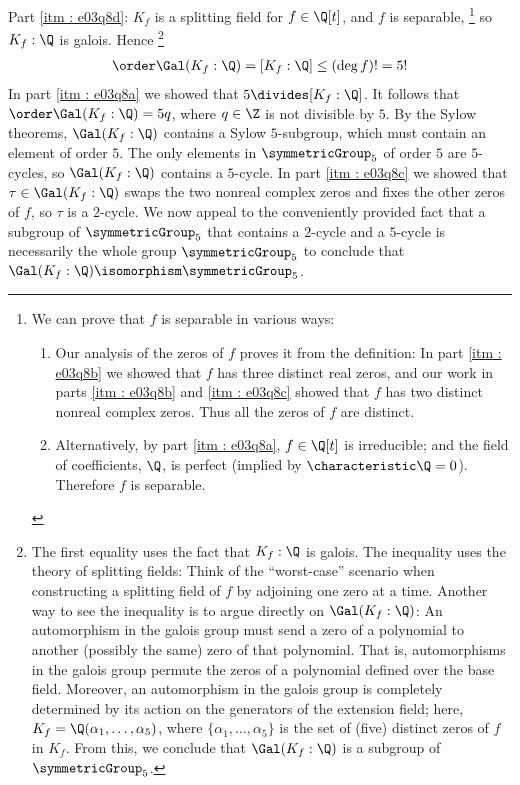 {Part \ref{itm : e03q8d}: $K_{f}$ is a splitting field for $f \in \Q[t]$, and $f$ is separable,%
\footnote{We can prove that $f$ is separable in various ways:
\begin{enumerate}
\item Our analysis of the zeros of $f$ proves it from the definition: In part \ref{itm : e03q8b} we showed that $f$ has three distinct real zeros, and our work in parts \ref{itm : e03q8b} and \ref{itm : e03q8c} showed that $f$ has two distinct nonreal complex zeros. Thus all the zeros of $f$ are distinct.
\item Alternatively, by part \ref{itm : e03q8a}, $f \in \Q[t]$ is irreducible; and the field of coefficients, $\Q$, is perfect (implied by $\characteristic \Q = 0$). Therefore $f$ is separable.
\end{enumerate}} %
so $K_{f} : \Q$ is galois. Hence%
\footnote{The first equality uses the fact that $K_{f} : \Q$ is galois. The inequality uses the theory of splitting fields: Think of the ``worst-case'' scenario when constructing a splitting field of $f$ by adjoining one zero at a time. Another way to see the inequality is to argue directly on $\Gal(K_{f} : \Q)$: An automorphism in the galois group must send a zero of a polynomial to another (possibly the same) zero of that polynomial. That is, automorphisms in the galois group permute the zeros of a polynomial defined over the base field. Moreover, an automorphism in the galois group is completely determined by its action on the generators of the extension field; here, $K_{f} = \Q(\alpha_{1}, \ldots, \alpha_{5})$, where $\{\alpha_{1}, \ldots, \alpha_{5}\}$ is the set of (five) distinct zeros of $f$ in $K_{f}$. From this, we conclude that $\Gal(K_{f} : \Q)$ is a subgroup of $\symmetricGroup_{5}$.}%
\begin{align*}
\order \Gal(K_{f} : \Q)
=
[K_{f} : \Q]
\leq
(\deg f)!
=
5!
\end{align*}
In part \ref{itm : e03q8a} we showed that $5 \divides [K_{f} : \Q]$. It follows that $\order \Gal(K_{f} : \Q) = 5 q$, where $q \in \Z$ is not divisible by $5$. By the Sylow theorems, $\Gal(K_{f} : \Q)$ contains a Sylow $5$-subgroup, which must contain an element of order $5$. The only elements in $\symmetricGroup_{5}$ of order $5$ are $5$-cycles, so $\Gal(K_{f} : \Q)$ contains a $5$-cycle. In part \ref{itm : e03q8c} we showed that $\tau \in \Gal(K_{f} : \Q)$ swaps the two nonreal complex zeros and fixes the other zeros of $f$, so $\tau$ is a $2$-cycle. We now appeal to the conveniently provided fact that a subgroup of $\symmetricGroup_{5}$ that contains a $2$-cycle and a $5$-cycle is necessarily the whole group $\symmetricGroup_{5}$ to conclude that $\Gal(K_{f} : \Q) \isomorphism \symmetricGroup_{5}$.}%